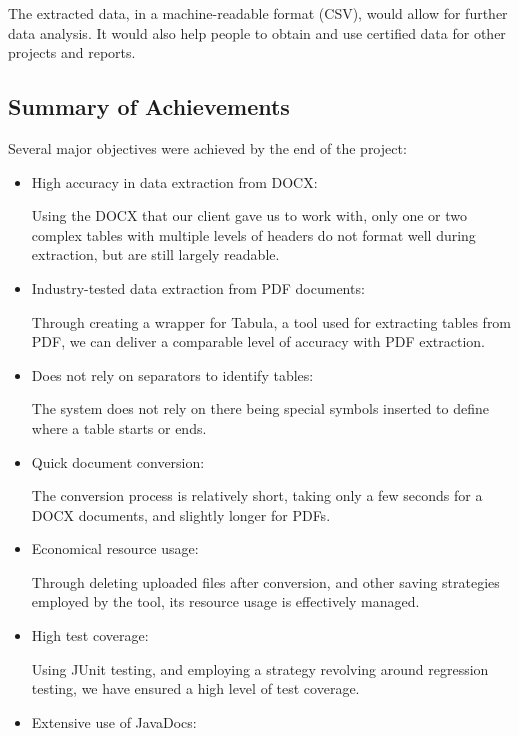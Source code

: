 \documentclass{l3proj}
\begin{document}
The extracted data, in a machine-readable format (CSV), would allow for further data analysis. It would also help people to obtain and use certified data for other projects and reports.

\subsection{Summary of Achievements}
\label{sec:summary_achievements}
Several major objectives were achieved by the end of the project:

\begin{itemize}
    \item High accuracy in data extraction from DOCX:
    
    Using the DOCX that our client gave us to work with, only one or two complex tables with multiple levels of headers do not format well during extraction, but are still largely readable.
    
    \item Industry-tested data extraction from PDF documents:
    
    Through creating a wrapper for Tabula, a tool used for extracting tables from PDF, we can deliver a comparable level of accuracy with PDF extraction.
    
    \item Does not rely on separators to identify tables:
    
    The system does not rely on there being special symbols inserted to define where a table starts or ends.
    
    \item Quick document conversion:
    
    The conversion process is relatively short, taking only a few seconds for a DOCX documents, and slightly longer for PDFs.
    
    \item Economical resource usage:
    
    Through deleting uploaded files after conversion, and other saving strategies employed by the tool, its resource usage is effectively managed.
    
    \item High test coverage:
    
    Using JUnit testing, and employing a strategy revolving around regression testing, we have ensured a high level of test coverage.
    
    \item Extensive use of JavaDocs:


\end{itemize}
\end{document}
